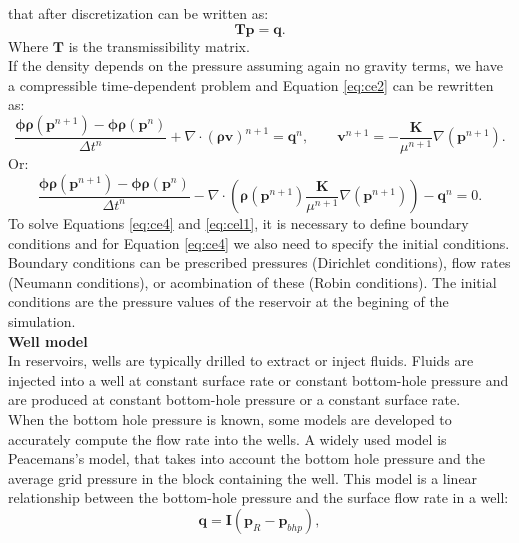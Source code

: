 \documentclass[12pt]{article}
\numberwithin{equation}{section}
\begin{document}
that after discretization can be written as:
 \begin{equation}\label{eq:cel1}
\mathbf{T}\mathbf{p} = \mathbf{q}.
\end{equation}
Where $\mathbf{T}$ is the transmissibility matrix.\\
If the density depends on the pressure assuming again no gravity terms, we have a compressible time-dependent problem 
and Equation \eqref{eq:ce2}
can be rewritten as:
\begin{equation}\label{eq:ce3}
 \frac{\mathbf{\phi}\mathbf{\rho}(\mathbf{p}^{n+1})
 -\mathbf{\phi}\mathbf{\rho}(\mathbf{p}^{n})}{\Delta t^n}
 +\nabla \cdot (\mathbf{\rho} \mathbf{v})^{n+1}=\mathbf{q}^{n},
\qquad
\mathbf{v}^{n+1}= -\frac{\mathbf{K}}{\mu^{n+1}}\nabla(\mathbf{p}^{n+1}).
\end{equation}
Or:
\begin{equation}\label{eq:ce4}
 \frac{\mathbf{\phi}\mathbf{\rho}(\mathbf{p}^{n+1})
 -\mathbf{\phi}\mathbf{\rho}(\mathbf{p}^{n})}{\Delta t^n}
 -\nabla \cdot (\mathbf{\rho}(\mathbf{p}^{n+1}) 
 \frac{\mathbf{K}}{\mu^{n+1}}\nabla(\mathbf{p}^{n+1}))-\mathbf{q}^{n}=0.
\end{equation}
To solve Equations \eqref{eq:ce4} and \eqref{eq:cel1}, it is necessary to define boundary conditions and for Equation 
\eqref{eq:ce4} we also need to specify the initial conditions.  Boundary conditions can be prescribed pressures 
(Dirichlet conditions),  flow rates (Neumann conditions),  or acombination of these (Robin conditions). The initial 
conditions are the pressure values of the reservoir at the begining of the simulation.\\
\textbf{Well model}\\
In reservoirs, wells are typically drilled to extract or inject fluids. Fluids are injected into a well at constant 
surface rate or constant bottom-hole pressure and are produced at constant bottom-hole pressure or a constant surface rate.\\
 When the bottom hole pressure is known, some models are developed to accurately compute the flow rate into the wells. 
 A widely used model is Peacemans's model, that takes into account the bottom hole pressure and the average grid 
 pressure in the block containing the well. 
This model is a linear relationship between the bottom-hole pressure and the surface flow rate in a well:
\begin{equation}\label{eq:wellm}
\mathbf{q}=\mathbf{I}(\mathbf{p}_R-\mathbf{p}_{bhp}),
\end{equation}
\end{document}
